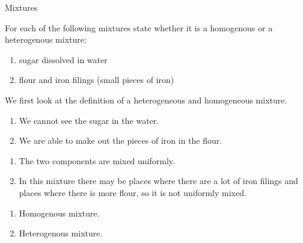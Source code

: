 \label{m38708*eip-479}
      \begin{wex}{Mixtures}
{For each of the following mixtures state whether it is a homogenous or a heterogenous mixture:
\label{m38708*eip-id1167649056231}\begin{enumerate}[noitemsep, label=\textbf{\alph*}. ] 
            \leftskip=20pt\rightskip=\leftskip\item sugar dissolved in water
\item flour and iron filings (small pieces of iron)
\end{enumerate} }
{
We first look at the definition of a heterogeneous and homogeneous mixture.
\begin{enumerate}[noitemsep, label=\textbf{\alph*}. ] 
\item We cannot see the sugar in the water.
\item We are able to make out the pieces of iron in the flour.
 \end{enumerate}
\begin{enumerate}[noitemsep, label=\textbf{\alph*}. ] 
\item The two components are mixed uniformly.
\item In this mixture there may be places where there are a lot of iron filings and places where there is more flour, so it is not uniformly mixed.
\end{enumerate}
\begin{enumerate}[noitemsep, label=\textbf{\alph*}. ] 
\item Homogenous mixture.
\item Heterogenous mixture.\end{enumerate}}
    \end{wex}
 
